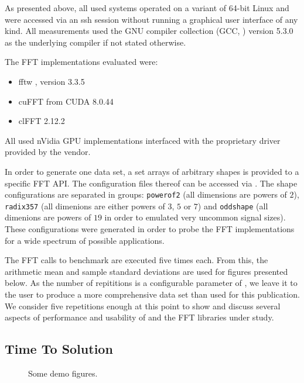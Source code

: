 As presented above, all used systems operated on a variant of 64-bit Linux and were accessed via an ssh session without running a graphical user interface of any kind. All measurements used the GNU compiler collection (GCC, \cite{stallman2001using}) version 5.3.0 as the underlying compiler if not stated otherwise. 

The FFT implementations evaluated were:

\begin{itemize}
\item fftw \cite{FFTW05}, version 3.3.5
\item cuFFT from CUDA 8.0.44
\item clFFT 2.12.2
\end{itemize}

All used nVidia GPU implementations interfaced with the proprietary driver provided by the vendor. 

In order to generate one data set, a set arrays of arbitrary shapes is provided to a specific FFT API. The configuration files thereof can be accessed via \cite{gearshifft_github}. The shape configurations are separated in groups: \texttt{powerof2} (all dimensions are powers of $2$), \texttt{radix357} (all dimenions are either powers of $3$, $5$ or $7$) and \texttt{oddshape} (all dimenions are powers of $19$ in order to emulated very uncommon signal sizes). These configurations were generated in order to probe the FFT implementations for a wide spectrum of possible applications.  

The FFT calls to benchmark are executed five times each. From this, the arithmetic mean and sample standard deviations are used for figures presented below. As the number of repititions is a configurable parameter of \gearshifft{}, we leave it to the user to produce a more comprehensive data set than used for this publication. We consider five repetitions enough at this point to show and discuss several aspects of performance and usability of \gearshifft{} and the FFT libraries under study.  

\subsection{Time To Solution}
\label{ssec:tts}



\begin{figure}[!tbp]
  \centering
  \def\svgwidth{0.4\columnwidth}
  \subfloat[Fig A.]{\label{fig:f1}}
  \hfill
  \def\svgwidth{0.4\columnwidth}
  \subfloat[Fig B.]{\label{fig:f2}}
  \caption{Some demo figures.}
\end{figure}



